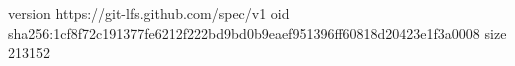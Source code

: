 version https://git-lfs.github.com/spec/v1
oid sha256:1cf8f72c191377fe6212f222bd9bd0b9eaef951396ff60818d20423e1f3a0008
size 213152

